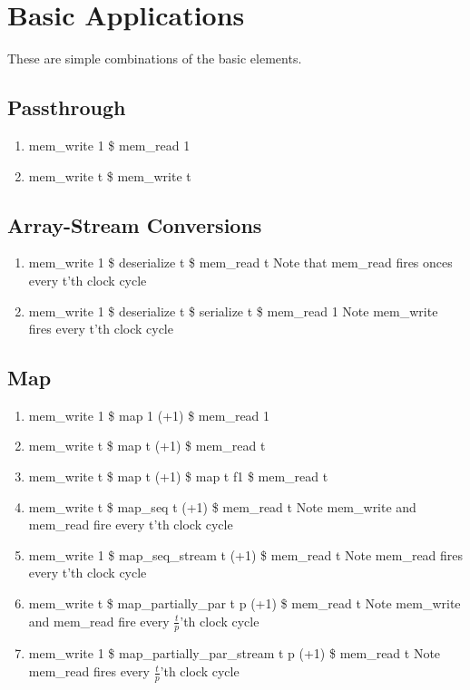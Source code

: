 \documentclass[11pt,fleqn]{article}
\numberwithin{equation}{subsection}
\begin{document}
\section{Basic Applications}
These are simple combinations of the basic elements.

\subsection{Passthrough}
\begin{enumerate}
    \item mem\_write 1 \$ mem\_read 1
    \item mem\_write t \$ mem\_write t 
\end{enumerate}

\subsection{Array-Stream Conversions}
\begin{enumerate}
    \item mem\_write 1 \$ deserialize t \$ mem\_read t
        \subitem Note that mem\_read fires onces every t'th clock cycle
    \item mem\_write 1 \$ deserialize t \$ serialize t \$ mem\_read 1
        \subitem Note mem\_write fires every t'th clock cycle
\end{enumerate}

\subsection{Map}
\begin{enumerate}
    \item mem\_write 1 \$ map 1 (+1) \$ mem\_read 1
    \item mem\_write t \$ map t (+1) \$ mem\_read t
    \item mem\_write t \$ map t (+1) \$ map t f1 \$ mem\_read t
    \item mem\_write t \$ map\_seq t (+1) \$ mem\_read t
        \subitem Note mem\_write and mem\_read fire every t'th clock cycle
    \item mem\_write 1 \$ map\_seq\_stream t (+1) \$ mem\_read t
        \subitem Note mem\_read fires every t'th clock cycle
    \item mem\_write t \$ map\_partially\_par t p (+1) \$ mem\_read t
        \subitem Note mem\_write and mem\_read fire every $\frac{t}{p}$'th clock cycle
    \item mem\_write 1 \$ map\_partially\_par\_stream t p (+1) \$ mem\_read t
        \subitem Note mem\_read fires every $\frac{t}{p}$'th clock cycle
\end{enumerate}
\end{document}
